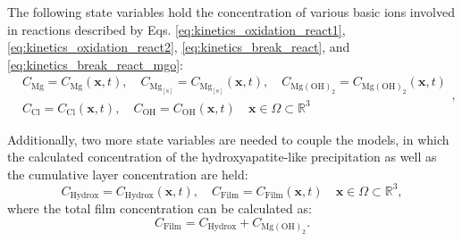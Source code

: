 The following state variables hold the concentration of various basic ions involved in reactions described by Eqs. \ref{eq:kinetics_oxidation_react1}, \ref{eq:kinetics_oxidation_react2}, \ref{eq:kinetics_break_react}, and \ref{eq:kinetics_break_react_mgo}:
\begin{equation} \label{eq:kinetics_state_vars_film}
\begin{aligned}
&C_{\mathrm{Mg}} = C_{\mathrm{Mg}}(\mathbf{x},t), \quad C_{\mathrm{Mg}_\mathrm{[s]}} = C_{\mathrm{Mg}_\mathrm{[s]}}(\mathbf{x},t), \quad C_{\mathrm{Mg}(\mathrm{OH})_{2}} = C_{\mathrm{Mg}(\mathrm{OH})_{2}}(\mathbf{x},t)  \\
&C_{\mathrm{Cl}} = C_{\mathrm{Cl}}(\mathbf{x},t), \quad C_{\mathrm{OH}} = C_{\mathrm{OH}}(\mathbf{x},t) \quad \mathbf{x} \in \Omega \subset \mathbb{R}^{3}
\end{aligned},
\end{equation}

Additionally, two more state variables are needed to couple the models, in which the calculated concentration of the hydroxyapatite-like precipitation as well as the cumulative layer concentration are held:
\begin{equation} \label{eq:kinetics_state_vars}
C_{\mathrm{Hydrox}} = C_{\mathrm{Hydrox}}(\mathbf{x},t), \quad C_{\mathrm{Film}} = C_{\mathrm{Film}}(\mathbf{x},t) \quad \mathbf{x} \in \Omega \subset \mathbb{R}^{3},
\end{equation}
where the total film concentration can be calculated as:
\begin{equation} \label{eq:kinetics_film_cumulative}
C_{\mathrm{Film}} = C_{\mathrm{Hydrox}} + C_{\mathrm{\mathrm{Mg}(\mathrm{OH})_{2}}}.
\end{equation}


